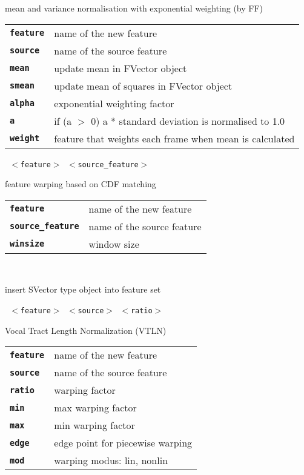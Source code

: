 \begin{description}
\begin{description}
        mean and variance normalisation with exponential weighting (by FF)

      \begin{tabular}{ll}
 \texttt{\textbf{feature}} &  name of the new feature \\
 \texttt{\textbf{source}} &   name of the source feature \\
 \texttt{\textbf{mean}} &     update mean in FVector object  \\
 \texttt{\textbf{smean}} &    update mean of squares in FVector object  \\
 \texttt{\textbf{alpha}} &    exponential weighting factor  \\
 \texttt{\textbf{a}} &         if (a $>$ 0) a * standard deviation is normalised to 1.0  \\
 \texttt{\textbf{weight}} &    feature that weights each frame when mean is calculated \\
      \end{tabular}
       \texttt{ $<$feature$>$ $<$source\_feature$>$ } \

        feature warping based on CDF matching

      \begin{tabular}{ll}
 \texttt{\textbf{feature}} &         name of the new feature \\
 \texttt{\textbf{source\_feature}} &  name of the source feature \\
 \texttt{\textbf{winsize}} &          window size  \\
      \end{tabular}
       \texttt{} \

        insert SVector type object into feature set

       \texttt{ $<$feature$>$ $<$source$>$ $<$ratio$>$    } \

        Vocal Tract Length Normalization (VTLN)

      \begin{tabular}{ll}
 \texttt{\textbf{feature}} &  name of the new feature \\
 \texttt{\textbf{source}} &   name of the source feature \\
 \texttt{\textbf{ratio}} &    warping factor  \\
 \texttt{\textbf{min}} &       max warping factor  \\
 \texttt{\textbf{max}} &       min warping factor  \\
 \texttt{\textbf{edge}} &      edge point for piecewise warping  \\
 \texttt{\textbf{mod}} &       warping modus: lin, nonlin  \\
      \end{tabular}
       \texttt{} \


\end{description}
\end{description}
